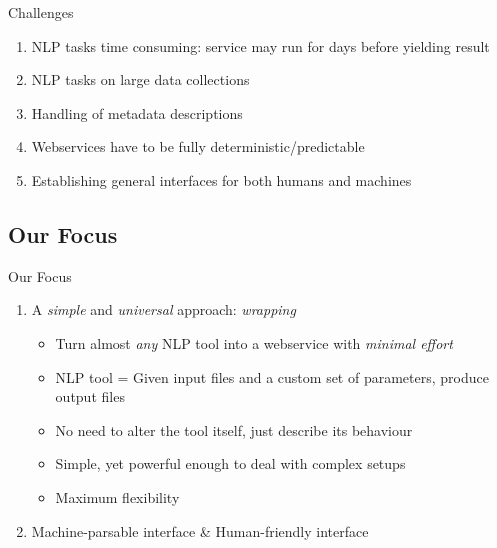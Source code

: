 \documentclass[compress]{beamer}
\begin{document}
\begin{frame}
    \begin{block}{Challenges} 
        \begin{enumerate}
            \item NLP tasks time consuming: service may run for days before yielding result
            \item NLP tasks on large data collections
            \item Handling of metadata descriptions
            \item Webservices have to be fully deterministic/predictable
            \item Establishing general interfaces for both humans and machines            
        \end{enumerate}
    \end{block}

\end{frame}



\subsection{Our Focus}
\begin{frame}
    \begin{block}{Our Focus}
   
        \begin{enumerate}
            \item A \emph{simple} and \emph{universal} approach: \emph{wrapping}
            \begin{itemize}
                \item Turn almost \emph{any} NLP tool into a webservice with \emph{minimal effort}
                \item NLP tool = Given input files and a custom set of parameters, produce output files
                \item No need to alter the tool itself, just describe its behaviour
                \item Simple, yet powerful enough to deal with complex setups
                \item Maximum flexibility
            \end{itemize}
            \item Machine-parsable interface \& Human-friendly interface            
        \end{enumerate}
    
    \end{block}
\end{frame}
\end{document}
